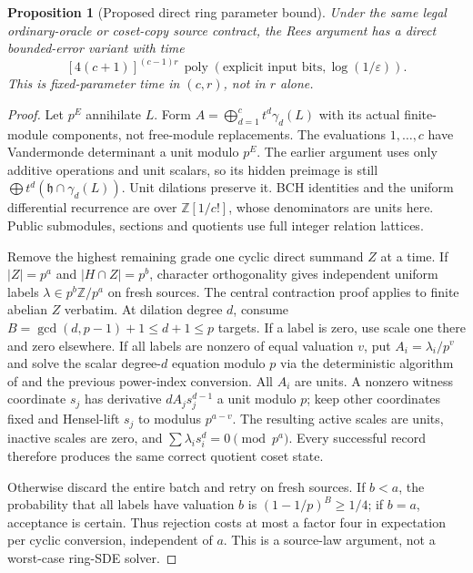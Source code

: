 \documentclass[11pt]{article}
\newtheorem{proposition}[theorem]{Proposition}
\theoremstyle{remark}
\newcommand{\eps}{\varepsilon}
\begin{document}
\begin{proposition}[Proposed direct ring parameter bound]
Under the same legal ordinary-oracle or coset-copy source contract, the
Rees argument has a direct bounded-error variant with time
\[
 [4(c+1)]^{(c-1)r}\,
 \operatorname{poly}(\text{explicit input bits},\log(1/\eps)).
\]
This is fixed-parameter time in $(c,r)$, not in $r$ alone.
\end{proposition}
\begin{proof}
Let $p^E$ annihilate $L$. Form
$A=\bigoplus_{d=1}^c t^d\gamma_d(L)$ with its actual finite-module
components, not free-module replacements. The evaluations $1,\ldots,c$
have Vandermonde determinant a unit modulo $p^E$. The earlier argument
uses only additive operations and unit scalars, so its hidden preimage
is still $\bigoplus t^d(\mathfrak h\cap\gamma_d(L))$.
Unit dilations preserve it. BCH identities and the uniform differential
recurrence are over $\mathbb Z[1/c!]$, whose denominators are units here.
Public submodules, sections and quotients use full integer relation lattices.

Remove the highest remaining grade one cyclic direct summand $Z$ at a
time. If $|Z|=p^a$ and $|H\cap Z|=p^b$, character orthogonality gives
independent uniform labels $\lambda\in p^b\mathbb Z/p^a$ on fresh sources.
The central contraction proof applies to finite abelian $Z$ verbatim.
At dilation degree $d$, consume $B=\gcd(d,p-1)+1\le d+1\le p$ targets.
If a label is zero, use scale one there and zero elsewhere. If all labels
are nonzero of equal valuation $v$, put $A_i=\lambda_i/p^v$ and solve the
scalar degree-$d$ equation modulo $p$ via the deterministic algorithm of
\cite[Fact 2]{is} and the previous
power-index conversion. All $A_i$ are units. A nonzero witness coordinate
$s_j$ has derivative $dA_js_j^{d-1}$ a unit modulo $p$; keep other
coordinates fixed and Hensel-lift $s_j$ to modulus $p^{a-v}$. The resulting
active scales are units, inactive scales are zero, and
$\sum\lambda_i s_i^d=0\pmod {p^a}$. Every successful record therefore
produces the same correct quotient coset state.

Otherwise discard the entire batch and retry on fresh sources. If $b<a$,
the probability that all labels have valuation $b$ is
$(1-1/p)^B\ge1/4$; if $b=a$, acceptance is certain. Thus rejection costs
at most a factor four in expectation per cyclic conversion, independent
of $a$. This is a source-law argument, not a worst-case ring-SDE solver.


\end{proof}
\end{document}
